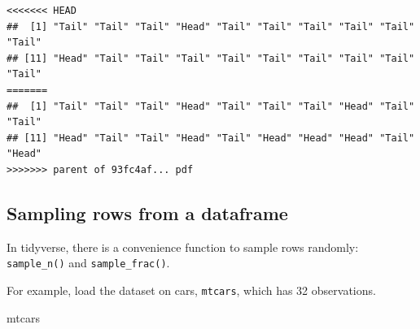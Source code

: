 \documentclass[]{book}
\newenvironment{Shaded}{\begin{snugshade}}{\end{snugshade}}
\newcommand{\NormalTok}[1]{#1}
\theoremstyle{definition}
\theoremstyle{definition}
\theoremstyle{definition}
\theoremstyle{remark}
\begin{document}
\begin{Shaded}
\begin{Highlighting}[]
\begin{Shaded}
\begin{Highlighting}[]
\begin{Shaded}
\begin{Highlighting}[]
\begin{verbatim}
<<<<<<< HEAD
##  [1] "Tail" "Tail" "Tail" "Head" "Tail" "Tail" "Tail" "Tail" "Tail" "Tail"
## [11] "Head" "Tail" "Tail" "Tail" "Tail" "Tail" "Tail" "Tail" "Tail" "Tail"
=======
##  [1] "Tail" "Tail" "Tail" "Head" "Tail" "Tail" "Tail" "Head" "Tail" "Tail"
## [11] "Head" "Tail" "Tail" "Head" "Tail" "Head" "Head" "Head" "Tail" "Head"
>>>>>>> parent of 93fc4af... pdf
\end{verbatim}

\hypertarget{sampling-rows-from-a-dataframe}{%
\subsection{Sampling rows from a dataframe}\label{sampling-rows-from-a-dataframe}}

In tidyverse, there is a convenience function to sample rows randomly: \texttt{sample\_n()} and \texttt{sample\_frac()}.

For example, load the dataset on cars, \texttt{mtcars}, which has 32 observations.

\begin{Shaded}
\begin{Highlighting}[]
\NormalTok{mtcars}
\end{Highlighting}
\end{Shaded}


\end{Highlighting}
\end{Shaded}
\end{Highlighting}
\end{Shaded}
\end{Highlighting}
\end{Shaded}
\end{document}
